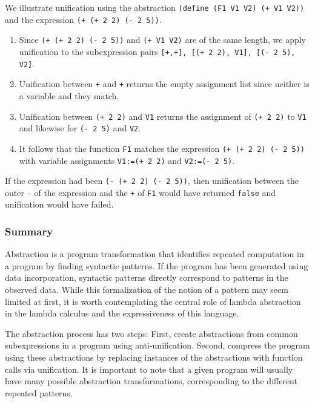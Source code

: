 \documentclass[a4paper,10pt]{article}
\begin{document}
We illustrate unification using the abstraction \texttt{(define (F1 V1 V2) (+ V1 V2))} and the expression \texttt{(+ (+ 2 2) (- 2 5))}.

\begin{enumerate}
  \item Since \texttt{(+ (+ 2 2) (- 2 5))} and \texttt{(+ V1 V2)} are of the same length, we apply unification to the subexpression pairs \texttt{[+,+], [(+ 2 2), V1], [(- 2 5), V2]}.
  \item Unification between \texttt{+} and \texttt{+} returns the empty assignment list since neither is a variable and they match.
  \item Unification between \texttt{(+ 2 2)} and \texttt{V1} returns the assignment of \texttt{(+ 2 2)} to \texttt{V1} and likewise for \texttt{(- 2 5)} and \texttt{V2}.
  \item It follows that the function \texttt{F1} matches the expression \texttt{(+ (+ 2 2) (- 2 5))} with variable assignments \texttt{V1:=(+ 2 2)} and \texttt{V2:=(- 2 5)}.
\end{enumerate}

If the expression had been \texttt{(- (+ 2 2) (- 2 5))}, then unification between the outer \texttt{-} of the expression and the \texttt{+} of \texttt{F1} would have returned \texttt{false} and unification would have failed.

\subsubsection{Summary}

Abstraction is a program transformation that identifies repeated computation in a program by finding syntactic patterns. If the program has been generated using data incorporation, syntactic patterns directly correspond to patterns in the observed data. While this formalization of the notion of a pattern may seem limited at first, it is worth contemplating the central role of lambda abstraction in the lambda calculus and the expressiveness of this language.

The abstraction process has two steps: First, create abstractions from common subexpressions in a program using anti-unification. Second, compress the program using these abstractions by replacing instances of the abstractions with function calls via unification.
It is important to note that a given program will usually have many possible abstraction transformations, corresponding to the different repeated patterns.
\end{document}
